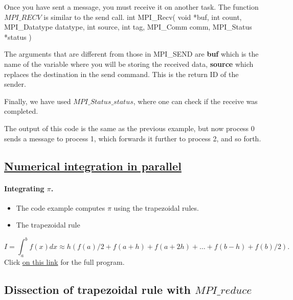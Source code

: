 \documentclass[%
oneside,                 %
final,                   %
10pt]{article}
\begin{document}
Once you have  sent a message, you must receive it on another task. The function $MPI\_RECV$
is similar to the send call.
\bcppcod
int MPI_Recv( void *buf, int count, MPI_Datatype datatype, 
            int source, 
            int tag, MPI_Comm comm, MPI_Status *status )
\ecppcod

The arguments that are different from those in MPI\_SEND are
\textbf{buf} which  is the name of the variable where you will  be storing the received data, 
\textbf{source} which  replaces the destination in the send command. This is the return ID of the sender.

Finally,  we have used  $MPI\_Status\_status$,  
where one can check if the receive was completed.

The output of this code is the same as the previous example, but now
process 0 sends a message to process 1, which forwards it further
to process 2, and so forth.



\subsection{\href{{https://github.com/CompPhysics/ComputationalPhysics2/blob/gh-pages/doc/Programs/LecturePrograms/programs/MPI/chapter07/program6.cpp}}{Numerical integration in parallel}}

\paragraph{Integrating $\pi$.}

\begin{itemize}
\item The code example computes $\pi$ using the trapezoidal rules.

\item The trapezoidal rule
\end{itemize}

\noindent
\[
   I=\int_a^bf(x) dx\approx h\left(f(a)/2 + f(a+h) +f(a+2h)+\dots +f(b-h)+ f(b)/2\right).
\]
Click \href{{https://github.com/CompPhysics/ComputationalPhysics2/blob/gh-pages/doc/Programs/LecturePrograms/programs/MPI/chapter07/program6.cpp}}{on this link} for the full program.



\subsection{Dissection of trapezoidal rule with $MPI\_reduce$}
\end{document}
